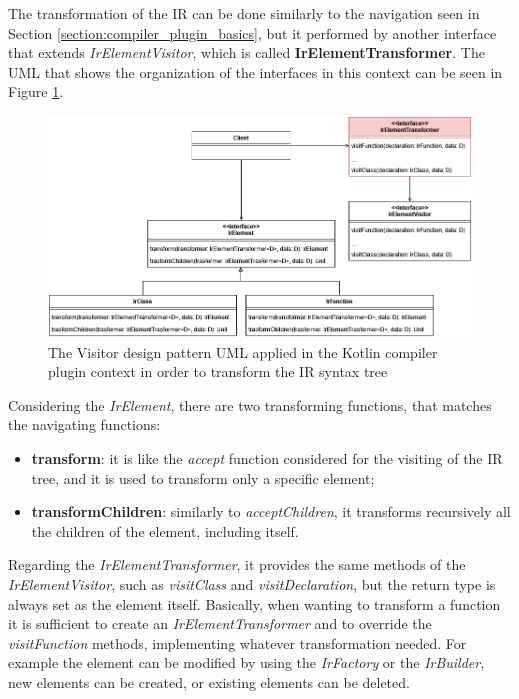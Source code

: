 The transformation of the IR can be done similarly to the navigation seen in Section \ref{section:compiler_plugin_basics}, but it performed by another interface that extends \textit{IrElementVisitor}, which is called \textbf{IrElementTransformer}. The UML that shows the organization of the interfaces in this context can be seen in Figure \ref{fig:transformer_uml_kotlin_compiler}.\newline
\begin{figure}[!ht]
    \centering
    \includegraphics[scale=0.5]{document/chapters/2-metaprogramming/images/transformer_uml_kotlin_compiler.png}
    \caption{The Visitor design pattern UML applied in the Kotlin compiler plugin context in order to transform the IR syntax tree}
    \label{fig:transformer_uml_kotlin_compiler}
\end{figure}
Considering the \textit{IrElement}, there are two transforming functions, that matches the navigating functions:
\begin{itemize}
    \item \textbf{transform}: it is like the \textit{accept} function considered for the visiting of the IR tree, and it is used to transform only a specific element;
    \item \textbf{transformChildren}: similarly to \textit{acceptChildren}, it transforms recursively all the children of the element, including itself.
\end{itemize}
Regarding the \textit{IrElementTransformer}, it provides the same methods of the \textit{IrElementVisitor}, such as \textit{visitClass} and \textit{visitDeclaration}, but the return type is always set as the element itself. Basically, when wanting to transform a function it is sufficient to create an \textit{IrElementTransformer} and to override the \textit{visitFunction} methods, implementing whatever transformation needed. For example the element can be modified by using the \textit{IrFactory} or the \textit{IrBuilder}, new elements can be created, or existing elements can be deleted.

